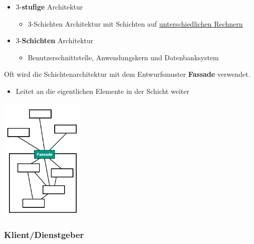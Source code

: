 			\begin{itemize}	
				\item 3-\textbf{stufige} Architektur
				\begin{itemize}
					\item 3-Schichten Architektur mit Schichten auf \underline{unterschiedlichen Rechnern}
				\end{itemize}
				\item 3-\textbf{Schichten} Architektur
				\begin{itemize}
					\item Benutzerschnittstelle, Anwendungskern und Datenbanksystem
				\end{itemize}
			\end{itemize}		
			Oft wird die Schichtenarchitektur mit dem Entwurfsmuster \textbf{Fassade} verwendet.
			\begin{itemize}
				\item Leitet an die eigentlichen Elemente in der Schicht weiter
			\end{itemize}				
			\begin{center}
				\includegraphics[width=0.3\textwidth]{../images/fassadeSchichtenarchitektur.png}
			\end{center}
						
		\subsubsection{Klient/Dienstgeber}
						
